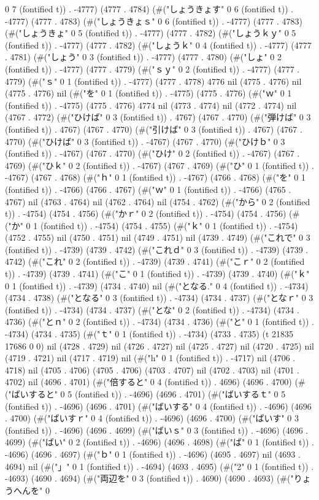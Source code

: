 0 7 (fontified t)) . -4777) (4777 . 4784) (#("しょうきょす" 0 6 (fontified t)) . -4777) (4777 . 4783) (#("しょうきょｓ" 0 6 (fontified t)) . -4777) (4777 . 4783) (#("しょうきょ" 0 5 (fontified t)) . -4777) (4777 . 4782) (#("しょうｋｙ" 0 5 (fontified t)) . -4777) (4777 . 4782) (#("しょうｋ" 0 4 (fontified t)) . -4777) (4777 . 4781) (#("しょう" 0 3 (fontified t)) . -4777) (4777 . 4780) (#("しょ" 0 2 (fontified t)) . -4777) (4777 . 4779) (#("ｓｙ" 0 2 (fontified t)) . -4777) (4777 . 4779) (#("ｓ" 0 1 (fontified t)) . -4777) (4777 . 4778) 4776 nil (4775 . 4776) nil (4775 . 4776) nil (#("を" 0 1 (fontified t)) . -4775) (4775 . 4776) (#("ｗ" 0 1 (fontified t)) . -4775) (4775 . 4776) 4774 nil (4773 . 4774) nil (4772 . 4774) nil (4767 . 4772) (#("ひけば" 0 3 (fontified t)) . 4767) (4767 . 4770) (#("弾けば" 0 3 (fontified t)) . 4767) (4767 . 4770) (#("引けば" 0 3 (fontified t)) . 4767) (4767 . 4770) (#("ひけば" 0 3 (fontified t)) . -4767) (4767 . 4770) (#("ひけｂ" 0 3 (fontified t)) . -4767) (4767 . 4770) (#("ひけ" 0 2 (fontified t)) . -4767) (4767 . 4769) (#("ひｋ" 0 2 (fontified t)) . -4767) (4767 . 4769) (#("ひ" 0 1 (fontified t)) . -4767) (4767 . 4768) (#("ｈ" 0 1 (fontified t)) . -4767) (4766 . 4768) (#("を" 0 1 (fontified t)) . -4766) (4766 . 4767) (#("ｗ" 0 1 (fontified t)) . -4766) (4765 . 4767) nil (4763 . 4764) nil (4762 . 4764) nil (4754 . 4762) (#("から" 0 2 (fontified t)) . -4754) (4754 . 4756) (#("かｒ" 0 2 (fontified t)) . -4754) (4754 . 4756) (#("か" 0 1 (fontified t)) . -4754) (4754 . 4755) (#("ｋ" 0 1 (fontified t)) . -4754) (4752 . 4755) nil (4750 . 4751) nil (4749 . 4751) nil (4739 . 4749) (#("これで" 0 3 (fontified t)) . -4739) (4739 . 4742) (#("これｄ" 0 3 (fontified t)) . -4739) (4739 . 4742) (#("これ" 0 2 (fontified t)) . -4739) (4739 . 4741) (#("こｒ" 0 2 (fontified t)) . -4739) (4739 . 4741) (#("こ" 0 1 (fontified t)) . -4739) (4739 . 4740) (#("ｋ" 0 1 (fontified t)) . -4739) (4734 . 4740) nil (#("となる." 0 4 (fontified t)) . -4734) (4734 . 4738) (#("となる" 0 3 (fontified t)) . -4734) (4734 . 4737) (#("となｒ" 0 3 (fontified t)) . -4734) (4734 . 4737) (#("とな" 0 2 (fontified t)) . -4734) (4734 . 4736) (#("とｎ" 0 2 (fontified t)) . -4734) (4734 . 4736) (#("と" 0 1 (fontified t)) . -4734) (4734 . 4735) (#("ｔ" 0 1 (fontified t)) . -4734) (4733 . 4735) (t 21835 17686 0 0) nil (4728 . 4729) nil (4726 . 4727) nil (4725 . 4727) nil (4720 . 4725) nil (4719 . 4721) nil (4717 . 4719) nil (#("h" 0 1 (fontified t)) . -4717) nil (4706 . 4718) nil (4705 . 4706) (4705 . 4706) (4703 . 4707) nil (4702 . 4703) nil (4701 . 4702) nil (4696 . 4701) (#("倍すると" 0 4 (fontified t)) . 4696) (4696 . 4700) (#("ばいすると" 0 5 (fontified t)) . -4696) (4696 . 4701) (#("ばいするｔ" 0 5 (fontified t)) . -4696) (4696 . 4701) (#("ばいする" 0 4 (fontified t)) . -4696) (4696 . 4700) (#("ばいすｒ" 0 4 (fontified t)) . -4696) (4696 . 4700) (#("ばいす" 0 3 (fontified t)) . -4696) (4696 . 4699) (#("ばいｓ" 0 3 (fontified t)) . -4696) (4696 . 4699) (#("ばい" 0 2 (fontified t)) . -4696) (4696 . 4698) (#("ば" 0 1 (fontified t)) . -4696) (4696 . 4697) (#("ｂ" 0 1 (fontified t)) . -4696) (4695 . 4697) nil (4693 . 4694) nil (#("」" 0 1 (fontified t)) . -4694) (4693 . 4695) (#("2" 0 1 (fontified t)) . -4693) (4690 . 4694) (#("両辺を" 0 3 (fontified t)) . 4690) (4690 . 4693) (#("りょうへんを" 0 